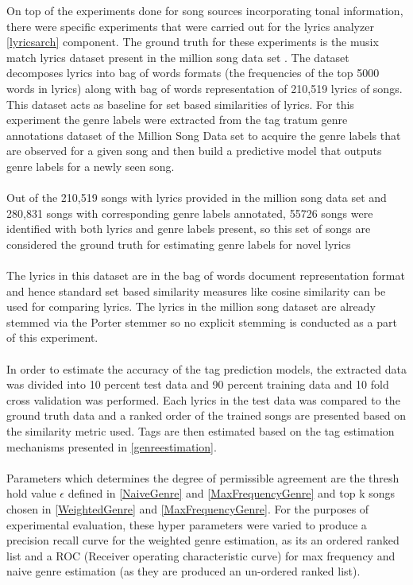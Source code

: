 \noindent On top of the experiments done for song sources incorporating tonal information, there were specific experiments that were carried out for the lyrics analyzer \ref{lyricsarch} component. The ground truth for these experiments is the musix match lyrics dataset present in the million song data set \cite{msd}. The dataset decomposes lyrics into bag of words formats (the frequencies of the top 5000 words in lyrics) along with bag of words representation of 210,519 lyrics of songs. This dataset acts as baseline for set based similarities of lyrics. For this experiment the genre labels were extracted from the tag tratum genre annotations dataset of the Million Song Data set \cite{msd} to acquire the genre labels that are observed for a given song and then build a predictive model that outputs genre labels for a newly seen song. \\\\
Out of the 210,519 songs with lyrics provided in the million song data set and 280,831 songs with corresponding genre labels annotated, 55726 songs were identified with both lyrics and genre labels present, so this set of songs are considered the ground truth for estimating genre labels for novel lyrics \\\\ 
The lyrics in this dataset are in the bag of words document representation format and hence standard set based similarity measures like cosine similarity can be used for comparing lyrics. The lyrics in the million song dataset are already stemmed via the Porter stemmer \cite{msd} so no explicit stemming is conducted as a part of this experiment.\\\\
In order to estimate the accuracy of the tag prediction models, the extracted data was divided into 10 percent test data and 90 percent training data and 10 fold cross validation was performed. Each lyrics in the test data was compared to the ground truth data and a ranked order of the trained songs are presented based on the similarity metric used. Tags are then estimated based on the tag estimation mechanisms presented in \ref{genreestimation}. \\\\
Parameters which determines the degree of permissible agreement are the thresh hold value $\epsilon$ defined in \ref{NaiveGenre} and \ref{MaxFrequencyGenre} and top k songs chosen in \ref{WeightedGenre} and \ref{MaxFrequencyGenre}. For the purposes of experimental evaluation, these hyper parameters were varied to produce a precision recall curve for the weighted genre estimation, as its an ordered ranked list and a ROC (Receiver operating characteristic curve) for max frequency and naive genre estimation (as they are produced an un-ordered ranked list). 

